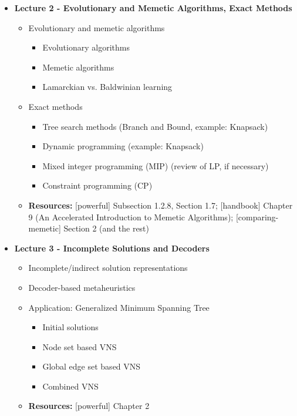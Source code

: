 \documentclass{article}
\begin{document}
\begin{itemize}
    \item \textbf{Lecture 2 - Evolutionary and Memetic Algorithms, Exact Methods}
    \begin{itemize}
        \item Evolutionary and memetic algorithms
        \begin{itemize}
            \item Evolutionary algorithms
            \item Memetic algorithms
            \item Lamarckian vs. Baldwinian learning
        \end{itemize}
        \item Exact methods
        \begin{itemize}
            \item Tree search methods (Branch and Bound, example: Knapsack)
            \item Dynamic programming (example: Knapsack)
            \item Mixed integer programming (MIP) (review of LP, if necessary)
            \item Constraint programming (CP)
        \end{itemize}
        \item \textbf{Resources:} [powerful] Subsection 1.2.8, Section 1.7; [handbook] Chapter 9 (An Accelerated Introduction to Memetic Algorithms); [comparing-memetic] Section 2 (and the rest)
    \end{itemize}

    \item \textbf{Lecture 3 - Incomplete Solutions and Decoders}
    \begin{itemize}
        \item Incomplete/indirect solution representations
        \item Decoder-based metaheuristics
        \item Application: Generalized Minimum Spanning Tree
        \begin{itemize}
            \item Initial solutions
            \item Node set based VNS
            \item Global edge set based VNS
            \item Combined VNS
        \end{itemize}
        \item \textbf{Resources:} [powerful] Chapter 2
    \end{itemize}


\end{itemize}
\end{document}

